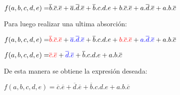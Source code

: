 $
\color{black}{f(a,b,c,d,e) =}  \overline{b}.\overline{c}.\overline{e} + \overline{a}.\overline{d}.\overline{e} + \overline{b}.c.d.e + b.\overline{c}.\overline{e} + a.\overline{d}.\overline{e} + a.b.\overline{c}$
\vspace{8mm}\par

Para luego realizar una ultima absorci\'on:\vspace{8mm}\par

$
\color{black}{f(a,b,c,d,e) =}  \color{red}{\overline{b}.\overline{c}.\overline{e}} \color{black}+ \color{blue}{\overline{a}.\overline{d}.\overline{e}} \color{black}+ \color{black}{\overline{b}.c.d.e} \color{black}+ \color{red}{b.\overline{c}.\overline{e}} \color{black}+ \color{blue}{a.\overline{d}.\overline{e}} \color{black}+ \color{black}{a.b.\overline{c}}$
\vspace{8mm}\par


$
\color{black}{f(a,b,c,d,e) =}  \color{red}{\overline{c}.\overline{e}} \color{black}+ \color{blue}{\overline{d}.\overline{e}}\color{black} + \color{black}{\overline{b}.c.d.e} +  \color{black}{a.b.\overline{c}}$
\vspace{8mm}\par


\noindent
\color{black}De esta manera se obtiene la expresi\'on deseada:\par\vspace{5mm}

$f(a,b,c,d,e) =  \overline{c}.\overline{e} + \overline{d}.\overline{e} + \overline{b}.c.d.e + a.b.\overline{c}$
\vspace{8mm}\par